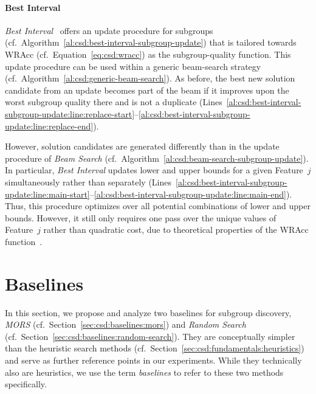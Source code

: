 \documentclass{article}
\theoremstyle{definition}
\begin{document}
\paragraph{Best Interval}

\emph{Best Interval}~\cite{mampaey2012efficient} offers an update procedure for subgroups (cf.~Algorithm~\ref{al:csd:best-interval-subgroup-update}) that is tailored towards WRAcc (cf.~Equation~\ref{eq:csd:wracc}) as the subgroup-quality function.
This update procedure can be used within a generic beam-search strategy (cf.~Algorithm~\ref{al:csd:generic-beam-search}).
As before, the best new solution candidate from an update becomes part of the beam if it improves upon the worst subgroup quality there and is not a duplicate (Lines~\ref{al:csd:best-interval-subgroup-update:line:replace-start}--\ref{al:csd:best-interval-subgroup-update:line:replace-end}).

However, solution candidates are generated differently than in the update procedure of \emph{Beam Search} (cf.~Algorithm~\ref{al:csd:beam-search-subgroup-update}).
In particular, \emph{Best Interval} updates lower and upper bounds for a given Feature~$j$ simultaneously rather than separately (Lines~\ref{al:csd:best-interval-subgroup-update:line:main-start}--\ref{al:csd:best-interval-subgroup-update:line:main-end}).
Thus, this procedure optimizes over all potential combinations of lower and upper bounds.
However, it still only requires one pass over the unique values of Feature~$j$ rather than quadratic cost, due to theoretical properties of the WRAcc function~\cite{mampaey2012efficient}.

\section{Baselines}
\label{sec:csd:baselines}

In this section, we propose and analyze two baselines for subgroup discovery, \emph{MORS} (cf.~Section~\ref{sec:csd:baselines:mors}) and \emph{Random Search} (cf.~Section~\ref{sec:csd:baselines:random-search}).
They are conceptually simpler than the heuristic search methods (cf.~Section~\ref{sec:csd:fundamentals:heuristics}) and serve as further reference points in our experiments.
While they technically also are heuristics, we use the term \emph{baselines} to refer to these two methods specifically.
\end{document}

